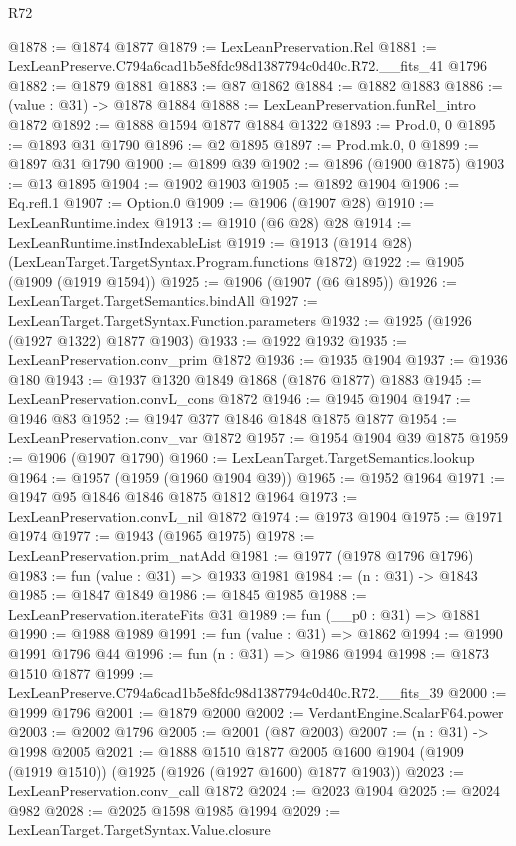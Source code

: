 \begin{lexlean}{R72}
\begin{coremodule}
@1878 := @1874 @1877
@1879 := LexLeanPreservation.Rel
@1881 := LexLeanPreserve.C794a6cad1b5e8fdc98d1387794c0d40c.R72.__fits_41 @1796
@1882 := @1879 @1881
@1883 := @87 @1862
@1884 := @1882 @1883
@1886 := (value : @31) -> @1878 @1884
@1888 := LexLeanPreservation.funRel_intro @1872
@1892 := @1888 @1594 @1877 @1884 @1322
@1893 := Prod.{0, 0}
@1895 := @1893 @31 @1790
@1896 := @2 @1895
@1897 := Prod.mk.{0, 0}
@1899 := @1897 @31 @1790
@1900 := @1899 @39
@1902 := @1896 (@1900 @1875)
@1903 := @13 @1895
@1904 := @1902 @1903
@1905 := @1892 @1904
@1906 := Eq.refl.{1}
@1907 := Option.{0}
@1909 := @1906 (@1907 @28)
@1910 := LexLeanRuntime.index
@1913 := @1910 (@6 @28) @28
@1914 := LexLeanRuntime.instIndexableList
@1919 := @1913 (@1914 @28) (LexLeanTarget.TargetSyntax.Program.functions @1872)
@1922 := @1905 (@1909 (@1919 @1594))
@1925 := @1906 (@1907 (@6 @1895))
@1926 := LexLeanTarget.TargetSemantics.bindAll
@1927 := LexLeanTarget.TargetSyntax.Function.parameters
@1932 := @1925 (@1926 (@1927 @1322) @1877 @1903)
@1933 := @1922 @1932
@1935 := LexLeanPreservation.conv_prim @1872
@1936 := @1935 @1904
@1937 := @1936 @180
@1943 := @1937 @1320 @1849 @1868 (@1876 @1877) @1883
@1945 := LexLeanPreservation.convL_cons @1872
@1946 := @1945 @1904
@1947 := @1946 @83
@1952 := @1947 @377 @1846 @1848 @1875 @1877
@1954 := LexLeanPreservation.conv_var @1872
@1957 := @1954 @1904 @39 @1875
@1959 := @1906 (@1907 @1790)
@1960 := LexLeanTarget.TargetSemantics.lookup
@1964 := @1957 (@1959 (@1960 @1904 @39))
@1965 := @1952 @1964
@1971 := @1947 @95 @1846 @1846 @1875 @1812 @1964
@1973 := LexLeanPreservation.convL_nil @1872
@1974 := @1973 @1904
@1975 := @1971 @1974
@1977 := @1943 (@1965 @1975)
@1978 := LexLeanPreservation.prim_natAdd
@1981 := @1977 (@1978 @1796 @1796)
@1983 := fun (value : @31) => @1933 @1981
@1984 := (n : @31) -> @1843
@1985 := @1847 @1849
@1986 := @1845 @1985
@1988 := LexLeanPreservation.iterateFits @31
@1989 := fun (__p0 : @31) => @1881
@1990 := @1988 @1989
@1991 := fun (value : @31) => @1862
@1994 := @1990 @1991 @1796 @44
@1996 := fun (n : @31) => @1986 @1994
@1998 := @1873 @1510 @1877
@1999 := LexLeanPreserve.C794a6cad1b5e8fdc98d1387794c0d40c.R72.__fits_39
@2000 := @1999 @1796
@2001 := @1879 @2000
@2002 := VerdantEngine.ScalarF64.power
@2003 := @2002 @1796
@2005 := @2001 (@87 @2003)
@2007 := (n : @31) -> @1998 @2005
@2021 := @1888
    @1510
    @1877
    @2005
    @1600
    @1904
    (@1909 (@1919 @1510))
    (@1925 (@1926 (@1927 @1600) @1877 @1903))
@2023 := LexLeanPreservation.conv_call @1872
@2024 := @2023 @1904
@2025 := @2024 @982
@2028 := @2025 @1598 @1985 @1994
@2029 := LexLeanTarget.TargetSyntax.Value.closure

\end{coremodule}
\end{lexlean}
